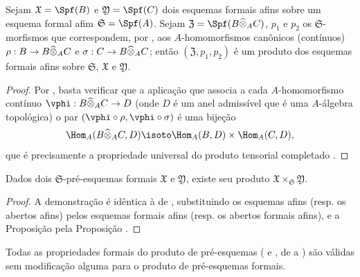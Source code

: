 \documentclass[oneside]{amsart}
\makeatletter
\newcommand{\ega@arrow}[2]{\mathchoice{#1}{#2}{#2}{#2}}
\renewcommand{\to}{\ega@arrow{\longrightarrow}{\rightarrow}}
\let\EGAOriginalLabel\label
\renewcommand{\label}[1]{\phantomsection\EGAOriginalLabel{#1}}
\makeatother
\begin{document}
\begin{proposition}[10.7.2]
\label{I.10.7.2}
Sejam $\mathfrak{X}=\Spf(B)$ e $\mathfrak{Y}=\Spf(C)$ dois esquemas formais afins sobre um esquema formal afim $\mathfrak{S}=\Spf(A)$.
Sejam $\mathfrak{Z}=\Spf(B\widehat{\otimes}_A C)$, $p_1$ e $p_2$ os $\mathfrak{S}$-morfismos que correspondem, por , aos $A$-homomorfismos canônicos (contínuos) $\rho:B\to B\widehat{\otimes}_A C$ e $\sigma:C\to B\widehat{\otimes}_A C$; então $(\mathfrak{Z},p_1,p_2)$ é um produto dos esquemas formais afins sobre $\mathfrak{S}$, $\mathfrak{X}$ e $\mathfrak{Y}$.
\end{proposition}

\begin{proof}
Por , basta verificar que a aplicação que associa a cada $A$-homomorfismo contínuo $\vphi:B\widehat{\otimes}_A C\to D$ (onde $D$ é um anel admissível que é uma $A$-álgebra topológica) o par $(\vphi\circ\rho,\vphi\circ\sigma)$ é uma bijeção
\[
  \Hom_A(B\widehat{\otimes}_A C,D)\isoto\Hom_A(B,D)\times\Hom_A(C,D),
\]
que é precisamente a propriedade universal do produto tensorial completado .
\end{proof}

\begin{proposition}[10.7.3]
\label{I.10.7.3}
Dados dois $\mathfrak{S}$-pré-esquemas formais $\mathfrak{X}$ e $\mathfrak{Y}$, existe seu produto $\mathfrak{X}\times_\mathfrak{S}\mathfrak{Y}$.
\end{proposition}

\begin{proof}
A demonstração é idêntica à de , substituindo os esquemas afins (resp. os abertos afins) pelos esquemas formais afins (resp. os abertos formais afins), e a Proposição  pela Proposição .
\end{proof}

Todas as propriedades formais do produto de pré-esquemas ( e , de  a ) são válidas sem modificação alguma para o produto de pré-esquemas formais.
\end{document}
